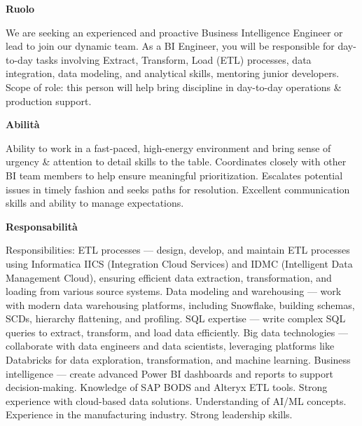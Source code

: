 \noindent\textbf{\textcolor{roleColor}{Ruolo}}\par
\noindent We are seeking an experienced and proactive Business Intelligence Engineer or lead to join our dynamic team. As a BI Engineer, you will be responsible for day-to-day tasks involving Extract, Transform, Load (ETL) processes, data integration, data modeling, and analytical skills, mentoring junior developers. Scope of role: this person will help bring discipline in day-to-day operations \& production support.\par
\noindent{\color{roleColor}\rule{\textwidth}{0.6pt}}\par\medskip

\noindent\textbf{\textcolor{skillColor}{Abilità}}\par
\noindent Ability to work in a fast-paced, high-energy environment and bring sense of urgency \& attention to detail skills to the table. Coordinates closely with other BI team members to help ensure meaningful prioritization. Escalates potential issues in timely fashion and seeks paths for resolution. Excellent communication skills and ability to manage expectations.\par
\noindent{\color{skillColor}\rule{\textwidth}{0.6pt}}\par\medskip

\noindent\textbf{\textcolor{responsibilityColor}{Responsabilità}}\par
\noindent Responsibilities: ETL processes — design, develop, and maintain ETL processes using Informatica IICS (Integration Cloud Services) and IDMC (Intelligent Data Management Cloud), ensuring efficient data extraction, transformation, and loading from various source systems. Data modeling and warehousing — work with modern data warehousing platforms, including Snowflake, building schemas, SCDs, hierarchy flattening, and profiling. SQL expertise — write complex SQL queries to extract, transform, and load data efficiently. Big data technologies — collaborate with data engineers and data scientists, leveraging platforms like Databricks for data exploration, transformation, and machine learning. Business intelligence — create advanced Power BI dashboards and reports to support decision-making. Knowledge of SAP BODS and Alteryx ETL tools. Strong experience with cloud-based data solutions. Understanding of AI/ML concepts. Experience in the manufacturing industry. Strong leadership skills.\par
\noindent{\color{responsibilityColor}\rule{\textwidth}{0.6pt}}\par\medskip

